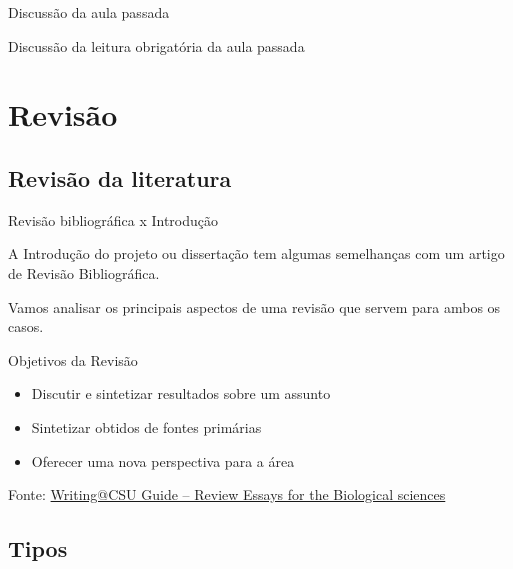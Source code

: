 \documentclass{beamer}
\begin{document}

\begin{frame}{Discussão da aula passada}
  \begin{block}{}
    Discussão da leitura obrigatória da aula passada
  \end{block}
\end{frame}

\section{Revisão}

\subsection{Revisão da literatura}

\begin{frame}{Revisão bibliográfica x Introdução}
  \begin{block}{}
    \footnotesize
    A Introdução do projeto ou dissertação tem algumas semelhanças com
    um artigo de Revisão Bibliográfica.

    \bigskip

    Vamos analisar os principais aspectos de uma revisão que servem
    para ambos os casos.
  \end{block}
\end{frame}

\begin{frame}{Objetivos da Revisão}
  \begin{itemize}
    \footnotesize
  \item Discutir e sintetizar resultados sobre um assunto
    \bigskip
  \item Sintetizar obtidos de fontes primárias
    \bigskip
  \item Oferecer uma nova perspectiva para a área
  \end{itemize}

  \vfill
  \scriptsize
  \hfill Fonte: \href{https://writing.colostate.edu/guides/guide.cfm?guideid=79}
  {\tiny Writing@CSU Guide -- Review Essays for the Biological sciences}
\end{frame}

\subsection{Tipos}
\end{document}
